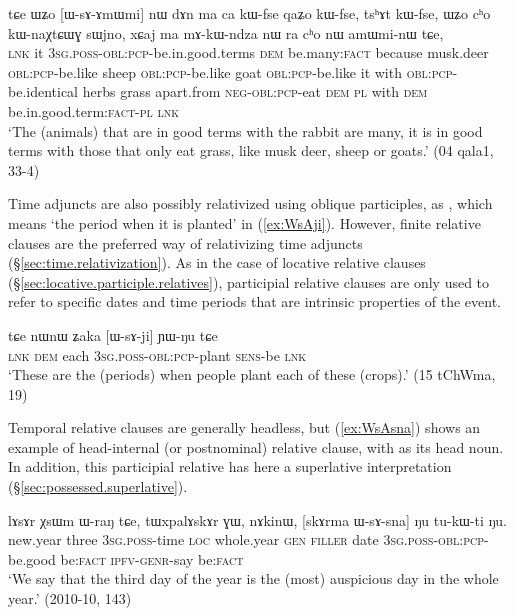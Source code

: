 \begin{exe}
   \ex \label{ex:WsAmWmi}
 \gll  tɕe ɯʑo [ɯ-sɤ-ɤmɯmi] nɯ dɤn ma ca kɯ-fse qaʑo kɯ-fse, tsʰɤt kɯ-fse,  ɯʑo cʰo kɯ-naχtɕɯɣ sɯjno, xɕaj ma mɤ-kɯ-ndza nɯ ra cʰo nɯ amɯmi-nɯ tɕe, \\
\textsc{lnk} it \textsc{3sg}.\textsc{poss}-\textsc{obl}:\textsc{pcp}-be.in.good.terms \textsc{dem} be.many:\textsc{fact} because musk.deer \textsc{obl}:\textsc{pcp}-be.like sheep \textsc{obl}:\textsc{pcp}-be.like goat  \textsc{obl}:\textsc{pcp}-be.like it with  \textsc{obl}:\textsc{pcp}-be.identical herbs grass apart.from \textsc{neg}-\textsc{obl}:\textsc{pcp}-eat \textsc{dem} \textsc{pl} with \textsc{dem} be.in.good.term:\textsc{fact}-\textsc{pl} \textsc{lnk} \\
\glt `The (animals) that are in good terms with the rabbit are many, it is in good terms with those that only eat grass, like musk deer, sheep or goats.' (04 qala1, 33-4)
\end{exe}

Time adjuncts are also possibly relativized using oblique participles, as , which means `the period when it is planted' in (\ref{ex:WsAji}). However, finite relative clauses are the preferred way of relativizing time adjuncts (§\ref{sec:time.relativization}). As in the case of locative relative clauses (§\ref{sec:locative.participle.relatives}), participial relative clauses are only used to refer to specific dates and time periods that are intrinsic properties of the event.

\begin{exe}
   \ex \label{ex:WsAji}
   \gll    tɕe nɯnɯ ʑaka [ɯ-sɤ-ji] ɲɯ-ŋu tɕe \\
   \textsc{lnk} \textsc{dem} each \textsc{3sg}.\textsc{poss}-\textsc{obl}:\textsc{pcp}-plant \textsc{sens}-be \textsc{lnk}\\
\glt `These are the (periods) when people plant each of these (crops).' (15 tChWma, 19)
\end{exe}

Temporal relative clauses are generally headless, but (\ref{ex:WsAsna}) shows an example of head-internal (or postnominal) relative clause, with  as its head noun. In addition, this participial relative has here a superlative interpretation (§\ref{sec:possessed.superlative}).

\begin{exe}
   \ex \label{ex:WsAsna}
   \gll    lɤsɤr χsɯm ɯ-raŋ tɕe, tɯxpalɤskɤr ɣɯ, nɤkinɯ, [skɤrma ɯ-sɤ-sna] ŋu tu-kɯ-ti ŋu. \\
   new.year three \textsc{3sg}.\textsc{poss}-time \textsc{loc} whole.year \textsc{gen} \textsc{filler} date \textsc{3sg}.\textsc{poss}-\textsc{obl}:\textsc{pcp}-be.good be:\textsc{fact} \textsc{ipfv}-\textsc{genr}-say be:\textsc{fact} \\
\glt `We say that the third day of the year is the (most) auspicious day in the whole year.' (2010-10, 143)
\end{exe}

